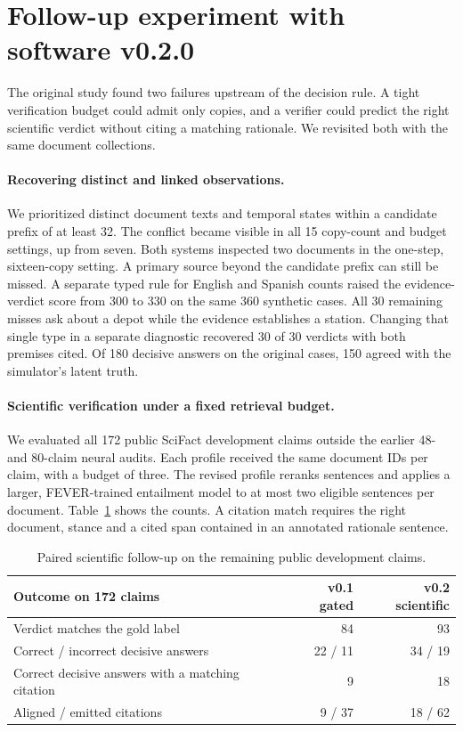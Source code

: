 \clearpage
\section*{Follow-up experiment with software v0.2.0}
\label{sec:followup}
\noindent The original study found two failures upstream of the decision rule. A tight verification budget could admit only copies, and a verifier could predict the right scientific verdict without citing a matching rationale. We revisited both with the same document collections.

\paragraph{Recovering distinct and linked observations.}
We prioritized distinct document texts and temporal states within a candidate prefix of at least 32. The conflict became visible in all 15 copy-count and budget settings, up from seven. Both systems inspected two documents in the one-step, sixteen-copy setting. A primary source beyond the candidate prefix can still be missed. A separate typed rule for English and Spanish counts raised the evidence-verdict score from 300 to 330 on the same 360 synthetic cases. All 30 remaining misses ask about a depot while the evidence establishes a station. Changing that single type in a separate diagnostic recovered 30 of 30 verdicts with both premises cited. Of 180 decisive answers on the original cases, 150 agreed with the simulator's latent truth.

\paragraph{Scientific verification under a fixed retrieval budget.}
We evaluated all 172 public SciFact development claims outside the earlier 48- and 80-claim neural audits. Each profile received the same document IDs per claim, with a budget of three. The revised profile reranks sentences and applies a larger, FEVER-trained entailment model to at most two eligible sentences per document. Table~\ref{tab:followup} shows the counts. A citation match requires the right document, stance and a cited span contained in an annotated rationale sentence.

\begin{table}[h]
\centering\small
\begin{tabular}{lrr}
\toprule
Outcome on 172 claims & v0.1 gated & v0.2 scientific\\
\midrule
Verdict matches the gold label & 84 & 93\\
Correct / incorrect decisive answers & 22 / 11 & 34 / 19\\
Correct decisive answers with a matching citation & 9 & 18\\
Aligned / emitted citations & 9 / 37 & 18 / 62\\
\bottomrule
\end{tabular}
\caption{Paired scientific follow-up on the remaining public development claims.}
\label{tab:followup}
\end{table}

